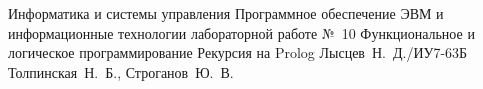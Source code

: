 \documentclass{bmstu}
\begin{document}
	
	\makereporttitle
	{Информатика и системы управления} %
	{Программное обеспечение ЭВМ и информационные технологии}
	{лабораторной работе №~10} %
	{Функциональное и логическое программирование} %
	{Рекурсия на Prolog} %
	{} %
	{Лысцев~Н.~Д./ИУ7-63Б} %
	{Толпинская~Н.~Б., Строганов~Ю.~В.} %
	{}
	
	
	
	
\end{document}
